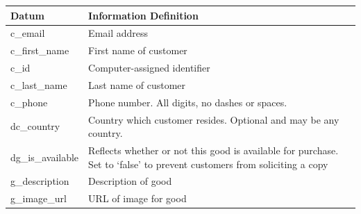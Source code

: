\documentclass[11pt, a4paper]{report}
\begin{document}
\begin{longtable}{|l|p{10cm}|}

\hline
\textbf{Datum}          & \textbf{Information Definition}                                                                                                                                       \\ \hline
c\_email                & Email address                                                                                                                                                         \\ \hline
c\_first\_name          & First name of customer                                                                                                                                                \\ \hline
c\_id                   & Computer-assigned identifier                                                                                                                                          \\ \hline
c\_last\_name           & Last name of customer                                                                                                                                                 \\ \hline
c\_phone                & Phone number. All digits, no dashes or spaces.                                                                                                                        \\ \hline
dc\_country             & Country which customer resides. Optional and may be any country.                                                                                                      \\ \hline
dg\_is\_available       & Reflects whether or not this good is available for purchase. Set to `false' to prevent customers from soliciting a copy                                               \\ \hline
g\_description          & Description of good                                                                                                                                                   \\ \hline
g\_image\_url           & URL of image for good                                                                                                                                                 \\ \hline

\end{longtable}
\end{document}
